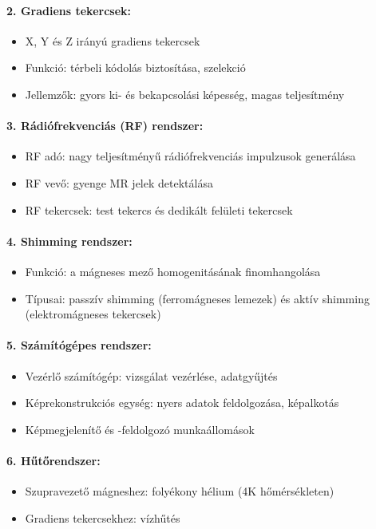 \documentclass[a4paper,12pt]{article}
\begin{document}
\paragraph{2. Gradiens tekercsek:} \begin{itemize} \item X, Y és Z irányú gradiens tekercsek \item Funkció: térbeli kódolás biztosítása, szelekció \item Jellemzők: gyors ki- és bekapcsolási képesség, magas teljesítmény \end{itemize}

\paragraph{3. Rádiófrekvenciás (RF) rendszer:} \begin{itemize} \item RF adó: nagy teljesítményű rádiófrekvenciás impulzusok generálása \item RF vevő: gyenge MR jelek detektálása \item RF tekercsek: test tekercs és dedikált felületi tekercsek \end{itemize}

\paragraph{4. Shimming rendszer:} \begin{itemize} \item Funkció: a mágneses mező homogenitásának finomhangolása \item Típusai: passzív shimming (ferromágneses lemezek) és aktív shimming (elektromágneses tekercsek) \end{itemize}

\paragraph{5. Számítógépes rendszer:} \begin{itemize} \item Vezérlő számítógép: vizsgálat vezérlése, adatgyűjtés \item Képrekonstrukciós egység: nyers adatok feldolgozása, képalkotás \item Képmegjelenítő és -feldolgozó munkaállomások \end{itemize}

\paragraph{6. Hűtőrendszer:} \begin{itemize} \item Szupravezető mágneshez: folyékony hélium (4K hőmérsékleten) \item Gradiens tekercsekhez: vízhűtés \end{itemize}
\end{document}
